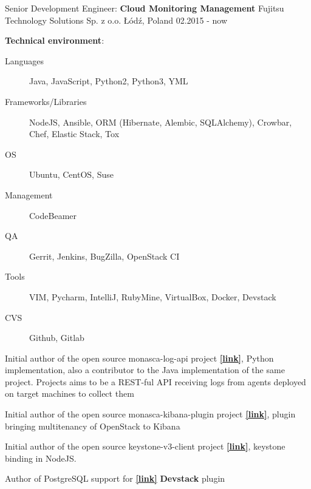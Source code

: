 
\begin{cventries}

  \cventry
  {Senior Development Engineer: \textbf{Cloud Monitoring Management}}
  {Fujitsu Technology Solutions Sp. z o.o.}
  {Łódź, Poland}
  {02.2015 - now}
  {
    \begin{cvitems}
      \item[]{
        \textbf{Technical environment}:
        \begin{description}
            \item[Languages] Java, JavaScript, Python2, Python3, YML
            \item[Frameworks/Libraries] NodeJS, Ansible, ORM (Hibernate, Alembic, SQLAlchemy), Crowbar, Chef, Elastic Stack, Tox
            \item[OS] Ubuntu, CentOS, Suse
            \item[Management] CodeBeamer
            \item[QA] Gerrit, Jenkins, BugZilla, OpenStack CI
            \item[Tools] VIM, Pycharm, IntelliJ, RubyMine, VirtualBox, Docker, Devstack
            \item[CVS] \faGithub\acvHeaderIconSep Github, \faGitlab\acvHeaderIconSep Gitlab
        \end{description}
      }
      \item{Initial author of the open source monasca-log-api project
              \href{https://github.com/openstack/monasca-log-api}{\textbf{[\faGithubSquare\acvHeaderIconSep link]}},
          Python implementation, also a contributor to the Java implementation
          of the same project. Projects aims to be a REST-ful
          API receiving logs from agents deployed on target machines to collect them
      }
      \item{Initial author of the open source monasca-kibana-plugin
          project \href{https://github.com/openstack/monasca-kibana-plugin}{\textbf{[\faGithubSquare\acvHeaderIconSep link]}},
          plugin bringing multitenancy of OpenStack to Kibana
      }
      \item{Initial author of the open source keystone-v3-client project
          \href{https://github.com/FujitsuEnablingSoftwareTechnologyGmbH/keystone-v3-client}{\textbf{[\faGithubSquare\acvHeaderIconSep link]}}, keystone binding in NodeJS.
      }
      \item{Author of PostgreSQL support for
          \href{https://github.com/openstack/monasca-api}{\textbf{[\faGithubSquare\acvHeaderIconSep link]}} \textbf{Devstack} plugin}

\end{cvitems}}
\end{cventries}
